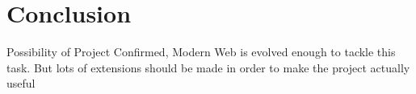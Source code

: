 \chapter{Conclusion}
\label{sec:conclusion}
Possibility of Project Confirmed, Modern Web is evolved enough to tackle this task. But lots of extensions should be made in order to make the project actually useful
